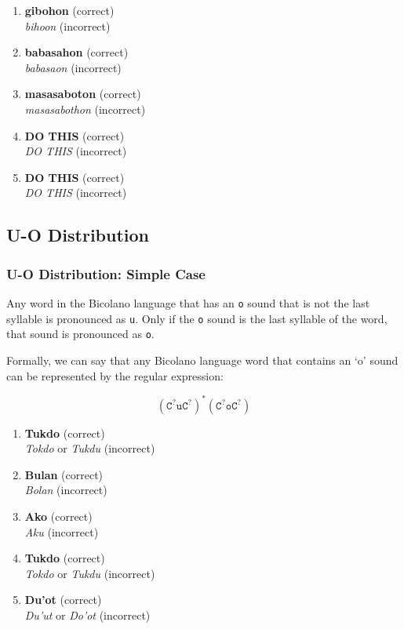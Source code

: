 \begin{enumerate}
      \item \textbf{gibohon} (correct) \\
            \textit{bihoon} (incorrect)
      \item \textbf{babasahon} (correct) \\
            \textit{babasaon} (incorrect)
      \item \textbf{masasaboton} (correct) \\
            \textit{masasabothon} (incorrect)
      \item \textbf{DO THIS} (correct) \\
            \textit{DO THIS} (incorrect)
      \item \textbf{DO THIS} (correct) \\
            \textit{DO THIS} (incorrect)
\end{enumerate}

\subsection{U-O Distribution}

\subsubsection{U-O Distribution: Simple Case}
Any word in the Bicolano language that has an \texttt{o} sound that is not the last syllable is pronounced as \texttt{u}. Only if the \texttt{o} sound is the last syllable of the word, that sound is pronounced as \texttt{o}.

Formally, we can say that any Bicolano language word that contains an ‘o’ sound can be represented by the regular expression:

\[
      \left(\texttt{C}^?\texttt{uC}^?\right)^* \left(\texttt{C}^?\texttt{oC}^?\right)
\]

\begin{example}
\end{example}

\begin{enumerate}
      \item \textbf{Tukdo} (correct) \\
            \textit{Tokdo} or \textit{Tukdu} (incorrect) \\
      \item \textbf{Bulan} (correct) \\
            \textit{Bolan} (incorrect) \\
      \item \textbf{Ako} (correct) \\
            \textit{Aku} (incorrect) \\
      \item \textbf{Tukdo} (correct) \\
            \textit{Tokdo} or \textit{Tukdu} (incorrect) \\
      \item \textbf{Du'ot} (correct) \\
            \textit{Du'ut} or \textit{Do'ot} (incorrect) \\
\end{enumerate}

